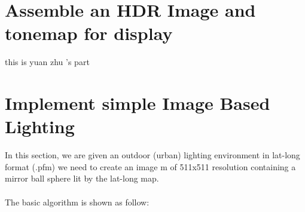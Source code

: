 \documentclass[12pt,twoside]{article}
\begin{document}






\section{Assemble an HDR Image and tonemap for display}
    this is yuan zhu 's part
    



\section{Implement simple Image Based Lighting}
    In this section, we are given an outdoor (urban) lighting environment in lat-long format (.pfm) we need to create an image m of 511x511 resolution containing a mirror ball sphere lit by the lat-long map. \\\\
    The basic algorithm is shown as follow: 
\end{document}
